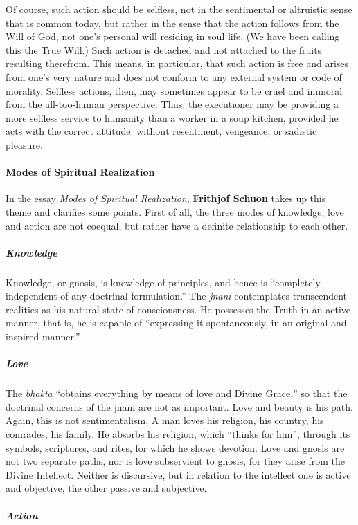 Of course, such action should be selfless, not in the sentimental or altruistic sense that is common today, but rather in the sense that the action follows from the Will of God, not one's personal will residing in soul life. (We have been calling this the True Will.) Such action is detached and not attached to the fruits resulting therefrom. This means, in particular, that such action is free and arises from one's very nature and does not conform to any external system or code of morality. Selfless actions, then, may sometimes appear to be cruel and immoral from the all-too-human perspective. Thus, the executioner may be providing a more selfless service to humanity than a worker in a soup kitchen, provided he acts with the correct attitude: without resentment, vengeance, or sadistic pleasure.

\paragraph{Modes of Spiritual Realization}


In the essay \emph{Modes of Spiritual Realization}, \textbf{Frithjof Schuon} takes up this theme and clarifies some points. First of all, the three modes of knowledge, love and action are not coequal, but rather have a definite relationship to each other.

\subparagraph{Knowledge}


Knowledge, or gnosis, is knowledge of principles, and hence is ``completely independent of any doctrinal formulation.'' The \emph{jnani} contemplates transcendent realities as his natural state of consciousness. He possesses the Truth in an active manner, that is, he is capable of ``expressing it spontaneously, in an original and inspired manner.''

\subparagraph{Love}


The \emph{bhakta} ``obtains everything by means of love and Divine Grace,'' so that the doctrinal concerns of the jnani are not as important. Love and beauty is his path. Again, this is not sentimentalism. A man loves his religion, his country, his comrades, his family. He absorbs his religion, which ``thinks for him'', through its symbols, scriptures, and rites, for which he shows devotion. Love and gnosis are not two separate paths, nor is love subservient to gnosis, for they arise from the Divine Intellect. Neither is discursive, but in relation to the intellect one is active and objective, the other passive and subjective.

\subparagraph{Action}


